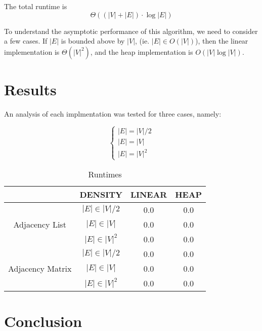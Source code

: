 \documentclass[technote]{IEEEtran}
\begin{document}
The total runtime is 
$$\Theta ( (|V| + |E|) \cdot \log|E| )$$


To understand the asymptotic performance of this algorithm, 
we need to consider a few cases.
If $|E|$ is bounded above by $|V|$, (ie. $|E| \in O(|V|)$), 
then the linear implementation is $\Theta(|V|^2)$, 
and the heap implementation is $O(|V| \log |V|)$.



\section{Results}

An analysis of each implmentation was tested for 
three cases, namely: 

$$
\begin{cases}
    |E| = |V|/2 \\
    |E| = |V|  \\
    |E| = |V|^2
\end{cases}
$$

\begin{table}[!ht]
    \caption{Runtimes}
    \centering
    \begin{tabular}{|c|c|c|c|}
        \hline
        & DENSITY & LINEAR & HEAP \\ \hline
        \multirow{3}{*}{Adjacency List} 
        & $|E| \in |V|/2$ & 0.0 & 0.0 \\ [0.5ex]\cline{2-4}
        & $|E| \in |V|$ & 0.0 & 0.0 \\ \cline{2-4}
        & $|E| \in |V|^2$ & 0.0 & 0.0 \\ \hline
        \multirow{3}{*}{Adjacency Matrix}
        & $|E| \in |V|/2$ & 0.0 & 0.0 \\ \cline{2-4}
        & $|E| \in |V|$ & 0.0 & 0.0 \\ \cline{2-4}
        & $|E| \in |V|^2$ & 0.0 & 0.0 \\ \hline
    \end{tabular}
\end{table}







\section{Conclusion}
\lipsum[1-2]
\nocite{*}


\end{document}
